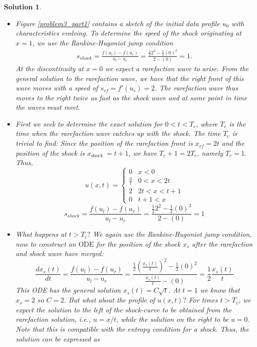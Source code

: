 \documentclass[10pt,letterpaper]{article}
\theoremstyle{break}
\newtheorem{mysolution}{Solution}
\newenvironment{solution}{\begin{mysolution}}{\end{mysolution}}
\begin{document}
\begin{solution}
    \begin{itemize}
        \item[(a)]
        Figure \ref{problem3_part1} contains a sketch of the initial data profile
        $u_0$ with characteristics evolving. To determine
        the speed of the shock originating at $x = 1$, we use the Rankine-Hugoniot jump condition
        \begin{gather}
            s_{shock}=\frac{f\left(u_{l}\right)-f\left(u_{r}\right)}{u_{l}-u_{r}}=\frac{\frac{1}{2} 2^{2}-\frac{1}{2}(0)^{2}}{2-(0)}=1.
        \end{gather}
        At the discontinuity at $x = 0$ we expect a rarefaction wave to arise. 
        From the general solution to the rarefaction wave, we have that the
        right front of this wave moves with a speed of $s_{rf} = f'(u_r) = 2$.
        The rarefaction wave thus moves to the right twice as fast as the
        shock wave and at some point in time the waves must meet.
        \item[(b)]
        First we seek to determine the exact solution for $0<t<T_{c}$, where $T_{c}$ is the time when the rarefaction wave catches up with the shock. The time $T_{c}$ is trivial to find: Since the position of the rarefaction front is $x_{r f}=2 t$ and the position of the shock is $x_{\text {shock }}=t+1$, we have $T_{c}+1=2 T_{c}$, namely $T_{c}=1 .$ Thus,
        $$
        u(x, t)=\left\{\begin{array}{ll}
        0 & x<0 \\
        \frac{x}{t} & 0<x<2 t \\
        2 & 2 t<x<t+1 \\
        0 & t+1<x
        \end{array}\right.
        $$
        $$
        s_{s h o c k}=\frac{f\left(u_{l}\right)-f\left(u_{r}\right)}{u_{l}-u_{r}}=\frac{\frac{1}{2} 2^{2}-\frac{1}{2}(0)^{2}}{2-(0)}=1
        $$
        \item[(c)]
        What happens at $t>T_{c} ?$ We again use the Rankine-Hugoniot jump condition, now to construct an $\mathrm{ODE}$ for the position of the shock $x_{s}$ after the rarefaction and shock wave have merged:
        $$
        \frac{d x_{s}(t)}{d t}=\frac{f\left(u_{l}\right)-f\left(u_{r}\right)}{u_{l}-u_{r}}=\frac{\frac{1}{2}\left(\frac{x_{s}(t)}{t}\right)^{2}-\frac{1}{2}(0)^{2}}{\frac{x_{s}(t)}{t}-(0)}=\frac{1}{2} \frac{x_{s}(t)}{t}
        $$
        This ODE has the general solution $x_{s}(t)=C \sqrt{t}$. At $t=1$ we know that $x_{s}=2$ so $C=2$. But what about the profile of $u(x, t) ?$ For times $t>T_{c}$, we expect the solution to the left of the shock-curve to be obtained from the rarefaction solution, i.e., $u=x / t$, while the solution on the right to be $u=0$. Note that this is compatible with the entropy condition for a shock. Thus, the solution can be expressed as

\end{itemize}
\end{solution}
\end{document}
